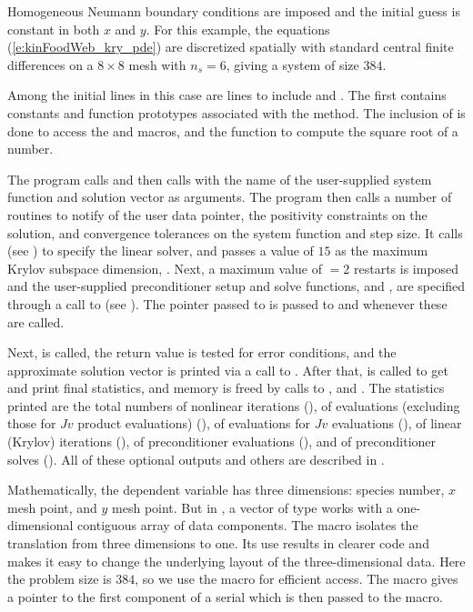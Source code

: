 Homogeneous Neumann boundary conditions are imposed and the initial
guess is constant in both $x$ and $y$. For this example, the equations
(\ref{e:kinFoodWeb_kry_pde}) are discretized spatially with standard central finite
differences on a $8 \times 8$ mesh with $n_s = 6$, giving a system of size $384$.

Among the initial  lines in this case are lines to
include  and .  The first contains
constants and function prototypes associated with the {\spgmr} method.
The inclusion of  is done to access the  and
 macros, and the  function to compute the square root
of a  number.

The  program calls  and then calls  with the
name of the user-supplied system function  and solution vector as
arguments.  The  program then calls a number of 
routines to notify {\kinsol} of the user data pointer, the
positivity constraints on the solution, and convergence tolerances on
the system function and step size.
It calls   (see ) to specify the {\kinspgmr} 
linear solver, and passes a  value of $15$ as the maximum Krylov subspace dimension,
.  Next, a maximum value of  $=2$ restarts is imposed and
the user-supplied preconditioner setup and solve functions,  and
, are specified through a call to
 (see ).
The  pointer passed to  is passed to  
and  whenever these are called. 

Next,  is called, the return value is tested for error conditions, and
the approximate solution vector is printed via a call to .
After that,  is called to get and print final statistics, and
memory is freed by calls to ,  and .
The statistics printed are the total numbers of nonlinear iterations (),
of  evaluations (excluding those for $Jv$ product evaluations) (),
of  evaluations for $Jv$ evaluations (), of linear (Krylov)
iterations (), of preconditioner evaluations (), and of
preconditioner solves (). All of these optional outputs and others are
described in .

Mathematically, the dependent variable has three dimensions: species
number, $x$ mesh point, and $y$ mesh point.  But in {\nvecs}, a vector of
type  works with a one-dimensional contiguous array of
data components. The macro  isolates the translation from
three dimensions to one. Its use results in clearer code and makes it
easy to change the underlying layout of the three-dimensional data. 
Here the problem size is $384$, so we use the  macro
for efficient  access. The  macro gives
a pointer to the first component of a serial  which is then
passed to the  macro.

